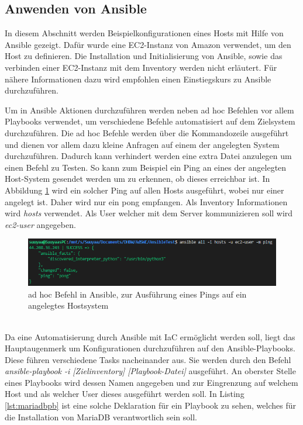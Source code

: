 \documentclass[biblatex]{lni}
\begin{document}
\subsection{Anwenden von Ansible}
In diesem Abschnitt werden Beispielkonfigurationen eines Hosts mit Hilfe von Ansible gezeigt. Dafür wurde eine EC2-Instanz von Amazon verwendet, um den Host zu definieren. Die Installation und Initialisierung von Ansible, sowie das verbinden einer EC2-Instanz mit dem Inventory werden nicht erläutert. Für nähere Informationen dazu wird empfohlen einen Einstiegskurs zu Ansible durchzuführen. 

Um in Ansible Aktionen durchzuführen werden neben ad hoc Befehlen vor allem Playbooks verwendet, um verschiedene Befehle automatisiert auf dem Zielsystem durchzuführen. Die ad hoc Befehle werden über die Kommandozeile ausgeführt und dienen vor allem dazu kleine Anfragen auf einem der angelegten System durchzuführen. Dadurch kann verhindert werden eine extra Datei anzulegen um einen Befehl zu Testen. So kann zum Beispiel ein Ping an eines der angelegten Host-System gesendet werden um zu erkennen, ob dieses erreichbar ist. In Abbildung \ref{fig:adhoccommand} wird ein solcher Ping auf allen Hosts ausgeführt, wobei nur einer angelegt ist. Daher wird nur ein pong empfangen. Als Inventory Informationen wird \textit{hosts} verwendet. Als User welcher mit dem Server kommunizieren soll wird \textit{ec2-user} angegeben.
\pagebreak
\begin{figure}
    \centering
    \includegraphics[width=12cm]{AnsibleScreenshots/adhoc.png}
    \caption{ad hoc Befehl in Ansible, zur Ausführung eines Pings auf ein angelegtes Hostsystem}
    \label{fig:adhoccommand}
\end{figure}\\
Da eine Automatisierung durch Ansible mit IaC ermöglicht werden soll, liegt das Hauptaugenmerk um Konfigurationen durchzuführen auf den Ansible-Playbooks. Diese führen verschiedene Tasks nacheinander aus. Sie werden durch den Befehl \textit{ansible-playbook -i [Zielinventory] [Playbook-Datei]} ausgeführt. An oberster Stelle eines Playbooks wird dessen Namen angegeben und zur Eingrenzung auf welchem Host und als welcher User dieses ausgeführt werden soll. In Listing \ref{lst:mariadbpb} ist eine solche Deklaration für ein Playbook zu sehen, welches für die Installation von MariaDB verantwortlich sein soll. 
\end{document}

